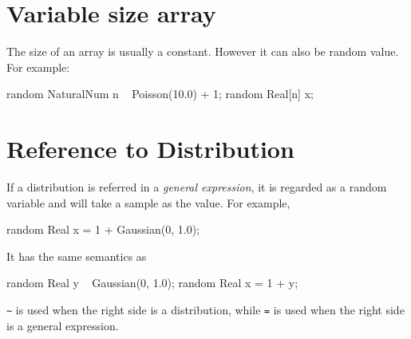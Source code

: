 \documentclass[12pt]{article}
\begin{document}
{\section{Variable size array}
The size of an array is usually a constant. However it can also be random value.
For example:
\begin{blogcode}
random NaturalNum n ~ Poisson(10.0) + 1;
random Real[n] x;
\end{blogcode}


\section{Reference to Distribution}
If a distribution is referred in a \emph{general expression}, it is regarded as a random variable and will take a sample as the value.
For example, 
\begin{blogcode}
random Real x = 1 + Gaussian(0, 1.0);
\end{blogcode}
It has the same semantics as
\begin{blogcode}
random Real y ~ Gaussian(0, 1.0);
random Real x = 1 + y;
\end{blogcode}
\texttt{\~{}} is used when the right side is a distribution, while \texttt{=} is used when the right side is a general expression. 
}
\end{document}
